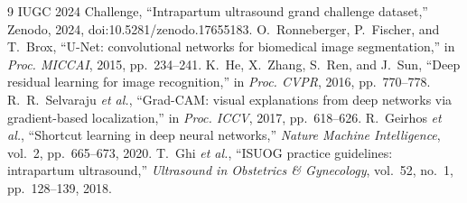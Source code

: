 \documentclass[conference]{IEEEtran}
\begin{document}
\begin{thebibliography}{9}
IUGC 2024 Challenge, ``Intrapartum ultrasound grand challenge dataset,''
Zenodo, 2024, doi:10.5281/zenodo.17655183.
O.~Ronneberger, P.~Fischer, and T.~Brox, ``U-Net: convolutional networks for
biomedical image segmentation,'' in \emph{Proc. MICCAI}, 2015, pp.~234--241.
K.~He, X.~Zhang, S.~Ren, and J.~Sun, ``Deep residual learning for image
recognition,'' in \emph{Proc. CVPR}, 2016, pp.~770--778.
R.~R.~Selvaraju \emph{et al.}, ``Grad-CAM: visual explanations from deep
networks via gradient-based localization,'' in \emph{Proc. ICCV}, 2017,
pp.~618--626.
R.~Geirhos \emph{et al.}, ``Shortcut learning in deep neural networks,''
\emph{Nature Machine Intelligence}, vol.~2, pp.~665--673, 2020.
T.~Ghi \emph{et al.}, ``ISUOG practice guidelines: intrapartum ultrasound,''
\emph{Ultrasound in Obstetrics \& Gynecology}, vol.~52, no.~1, pp.~128--139,
2018.
\end{thebibliography}
\end{document}
